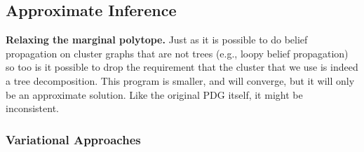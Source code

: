 {\subsection{Approximate Inference}
\textbf{Relaxing the marginal polytope.}
Just as it is possible to do belief propagation on cluster graphs that are not trees (e.g., loopy belief propagation)
so too is it possible to drop the requirement that the cluster that we use is indeed a tree decomposition.
This program is smaller, and will converge, but it will only be an approximate solution.
Like the original PDG itself, it might be inconsistent.

\subsubsection{Variational Approaches}






}
